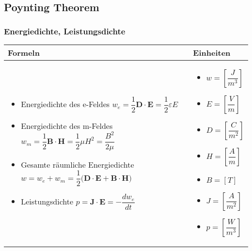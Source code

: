 \subsection{Poynting Theorem}
\subsubsection{Energiedichte, Leistungsdichte}
\begin{tabular}{ | m{15cm} | m{3cm}  | }
	\hline
	Formeln & Einheiten \\ \hline
	\hline
	\begin{itemize}
		\item[] Energiedichte des e-Feldes $w_e=\dfrac{1}{2}\mathbf{D\cdot E}=\dfrac{1}{2}\varepsilon E$
		\item[] Energiedichte des m-Feldes $w_m=\dfrac{1}{2}\mathbf{B\cdot H}=\dfrac{1}{2}\mu H^2=\dfrac{B^2}{2\mu}$
		\item[] Gesamte räumliche Energiedichte $w=w_e+w_m=\dfrac{1}{2}\big(\mathbf{D\cdot E + B\cdot H}\big)$
		\item[] Leistungsdichte $p=\mathbf{J\cdot E}=-\dfrac{dw_e}{dt}$
		
	\end{itemize} 
	&   	
	\begin{itemize}
		\item[] $w=[\dfrac{J}{m^3}]$
		\item[] $E=[\dfrac{V}{m}]$
		\item[] $D=[\dfrac{C}{m^2}]$
		\item[] $H=[\dfrac{A}{m}]$
		\item[] $B=[T]$
		\item[] $J=[\dfrac{A}{m^2}]$
		\item[] $p=[\dfrac{W}{m^3}]$
	\end{itemize} 
	\\ \hline
\end{tabular}

